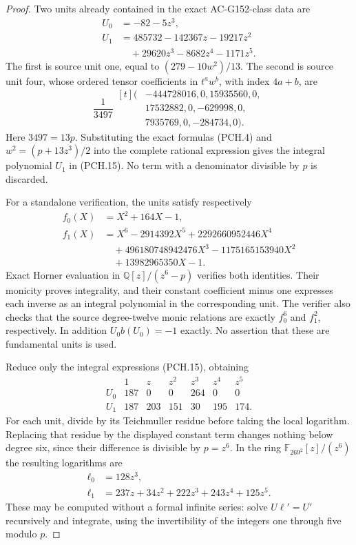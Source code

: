 \begin{proof}
Two units already contained in the exact AC-G152-class data are
\[
 \begin{aligned}
 U_0&=-82-5z^3,\\
 U_1&=485732-142367z-19217z^2\\
    &\quad+29620z^3-8682z^4-1171z^5.
 \end{aligned}
 \tag{PCH.15}
\]
The first is source unit one, equal to $(279-10w^2)/13$.
The second is source unit four, whose ordered tensor coefficients
in $t^aw^b$, with index $4a+b$, are
\[
 \frac1{3497}\begin{aligned}[t]
 (&-444728016,0,15935560,0,\\
  &17532882,0,-629998,0,\\
  &7935769,0,-284734,0).
 \end{aligned}
 \tag{PCH.16}
\]
Here $3497=13p$.  Substituting the exact formulas (PCH.4) and
$w^2=(p+13z^3)/2$ into the complete rational expression gives
the integral polynomial $U_1$ in (PCH.15).
No term with a denominator divisible by $p$ is discarded.

For a standalone verification, the units satisfy respectively
\[
 \begin{aligned}
 f_0(X)&=X^2+164X-1,\\
 f_1(X)&=X^6-2914392X^5+2292660952446X^4\\
       &\quad+496180748942476X^3-1175165153940X^2\\
       &\quad+13982965350X-1.
 \end{aligned}
 \tag{PCH.17}
\]
Exact Horner evaluation in $\mathbb Q[z]/(z^6-p)$ verifies both
identities.  Their monicity proves integrality, and their constant
coefficient minus one expresses each inverse as an integral
polynomial in the corresponding unit.
The verifier also checks that the source degree-twelve monic
relations are exactly $f_0^6$ and $f_1^2$, respectively.
In addition $U_0b(U_0)=-1$ exactly.
No assertion that these are fundamental units is used.

Reduce only the integral expressions (PCH.15), obtaining
\[
 \begin{array}{c|rrrrrr}
       &1&z&z^2&z^3&z^4&z^5\\ \hline
 U_0&187&0&0&264&0&0\\
 U_1&187&203&151&30&195&174.
 \end{array}
 \tag{PCH.18}
\]
For each unit, divide by its Teichmuller residue before taking
the local logarithm.  Replacing that residue by the displayed
constant term changes nothing below degree six, since their
difference is divisible by $p=z^6$.
In the ring $\mathbb F_{269^2}[z]/(z^6)$ the resulting logarithms are
\[
 \begin{aligned}
 \ell_0&=128z^3,\\
 \ell_1&=237z+34z^2+222z^3+243z^4+125z^5.
 \end{aligned}
 \tag{PCH.19}
\]
These may be computed without a formal infinite series:
solve $U\ell'=U'$ recursively and integrate, using the invertibility
of the integers one through five modulo $p$.


\end{proof}
